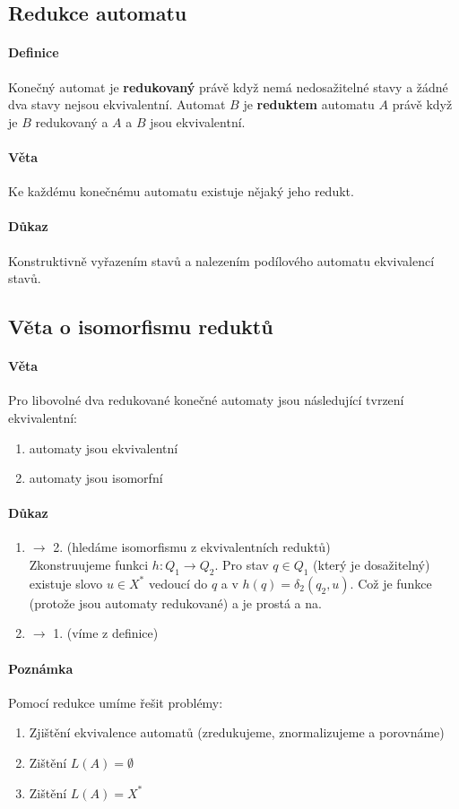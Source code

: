 \documentclass[a4paper,12pt,titlepage]{article}
\begin{document}
\subsection{Redukce automatu}
\setcounter{equation}{0}
\paragraph{Definice}
Konečný automat je \textbf{redukovaný} právě když nemá nedosažitelné stavy a
žádné dva stavy nejsou ekvivalentní. Automat $B$ je \textbf{reduktem} automatu
$A$ právě když je $B$ redukovaný a $A$ a $B$ jsou ekvivalentní.
\paragraph{Věta}
Ke každému konečnému automatu existuje nějaký jeho redukt.
\paragraph{Důkaz}
Konstruktivně vyřazením stavů a nalezením podílového automatu ekvivalencí stavů.
\subsection{Věta o isomorfismu reduktů}
\setcounter{equation}{0}
\paragraph{Věta}
Pro libovolné dva redukované konečné automaty jsou následující tvrzení
ekvivalentní:
\begin{enumerate}
	\item automaty jsou ekvivalentní
	\item automaty jsou isomorfní
\end{enumerate}
\paragraph{Důkaz}
\begin{enumerate}
	\item $\to$ 2. (hledáme isomorfismu z ekvivalentních reduktů) \\
		Zkonstruujeme funkci $h: Q_1\to Q_2$. Pro stav $q \in Q_1$ (který je
		dosažitelný) existuje slovo $u \in X^*$ vedoucí do $q$ a
		v $h(q) = \delta_2(q_2, u)$. Což je funkce (protože jsou automaty
		redukované) a je prostá a na.
	\item $\to$ 1. (víme z definice)
\end{enumerate}
\paragraph{Poznámka}
Pomocí redukce umíme řešit problémy:
\begin{enumerate}
	\item Zjištění ekvivalence automatů (zredukujeme, znormalizujeme a
	porovnáme)
	\item Zištění $L(A) = \emptyset$
	\item Zištění $L(A) = X^*$
\end{enumerate}
\end{document}
